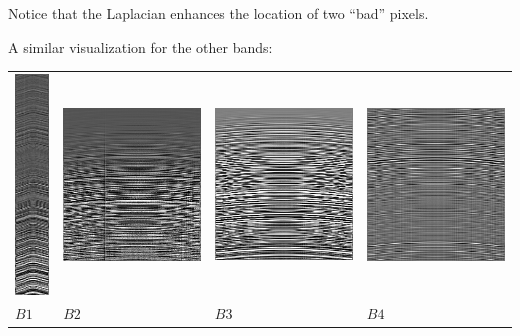 \documentclass[a4paper]{article}    %
\theoremstyle{note}
\theoremstyle{plain}
\begin{document}
Notice that the Laplacian enhances the location of two ``bad'' pixels.

A similar visualization for the other bands:

\begin{tabular}{llll}
	\includegraphics[height=0.38\linewidth]{f/b1_lapavgs.png} &
	\includegraphics[height=0.38\linewidth]{f/b2_lapavgs.png} &
	\includegraphics[height=0.38\linewidth]{f/b3_lapavgs.png} &
	\includegraphics[height=0.38\linewidth]{f/b4_lapavgs.png} \\
	$B1$ & $B2$ & $B3$ & $B4$
\end{tabular}
\end{document}
